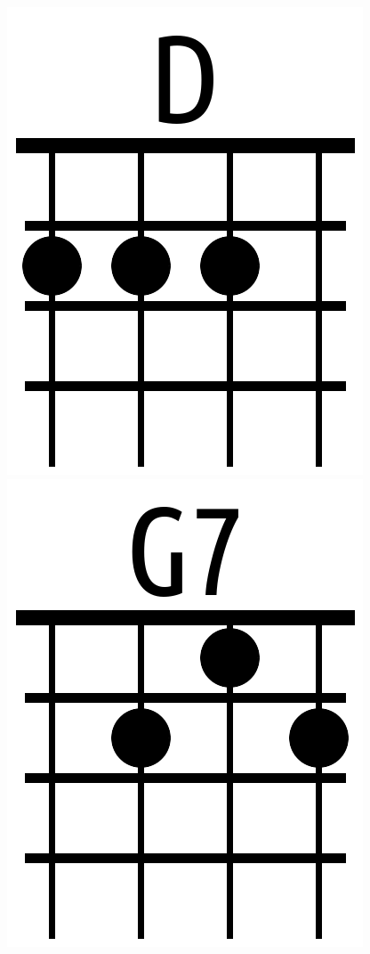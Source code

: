 \documentclass[twoside]{article}
\begin{document}
{	\includegraphics[width=\marginparwidth]{chords/D.png}
	\includegraphics[width=\marginparwidth]{chords/G7.png}
}
\end{document}
